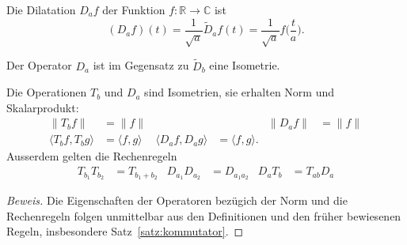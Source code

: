 
\begin{definition}
Die Dilatation $D_af$ der Funktion $f\colon\mathbb R\to\mathbb C$ ist 
\[
(D_af)(t)
=
\frac{1}{\sqrt{a}} \tilde{D}_af(t)
=
\frac{1}{\sqrt{a}} f\biggl(\frac{t}{a}\biggr).
\]
\end{definition}
Der Operator $D_a$ ist im Gegensatz zu $\tilde{D}_b$ eine Isometrie.

\begin{satz}
\label{fourier:satz:TDisometrie}
Die Operationen $T_b$ und $D_a$ sind Isometrien, sie erhalten 
Norm und Skalarprodukt:
\begin{equation}
\begin{aligned}
\|T_bf\| &= \|f\|
&&\qquad&
\|D_af\| &= \|f\|
\\
\langle T_bf,T_bg\rangle &= \langle f,g\rangle
&
\langle D_af,D_ag\rangle &= \langle f,g\rangle.
\end{aligned}
\label{fourier:satz:formel:isometrie}
\end{equation}
Ausserdem gelten die Rechenregeln
\begin{align*}
T_{b_1}T_{b_2}&=T_{b_1+b_2}
&
D_{a_1} D_{a_2}&=D_{a_1a_2}
&
D_aT_b
&=
T_{ab}D_a
\end{align*}
\end{satz}

\begin{proof}[Beweis]
Die Eigenschaften der Operatoren bezügich der Norm und die Rechenregeln
folgen unmittelbar aus den Definitionen und
den früher bewiesenen Regeln, insbesondere Satz~\ref{satz:kommutator}.
\end{proof}

